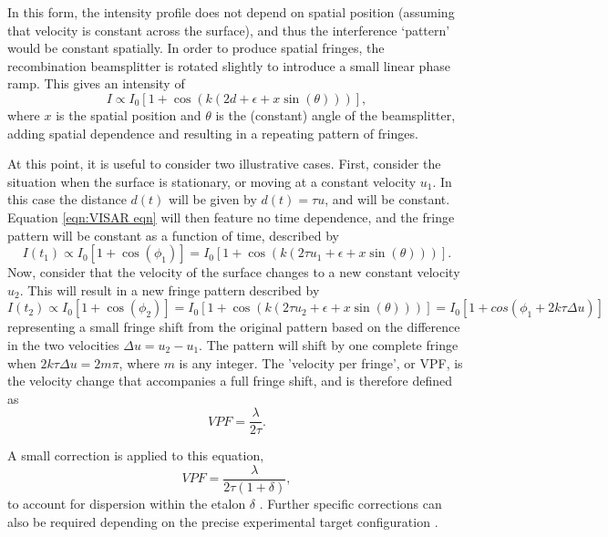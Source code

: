 In this form, the intensity profile does not depend on spatial position (assuming that velocity is constant across the surface), and thus the interference `pattern' would be constant spatially. In order to produce spatial fringes, the recombination beamsplitter is rotated slightly to introduce a small linear phase ramp. This gives an intensity of \begin{equation} \label{eqn:VISAR eqn}I \propto  I_0 [1 + \cos(k (2d + \epsilon + x\sin(\theta) ))],\end{equation} where $x$ is the spatial position and $\theta$ is the (constant) angle of the beamsplitter, adding spatial dependence and resulting in a repeating pattern of fringes.

At this point, it is useful to consider two illustrative cases. First, consider the situation when the surface is stationary, or moving at a constant velocity $u_1$. In this case the distance $d(t)$ will be given by $d(t) = \tau u$, and will be constant. Equation \ref{eqn:VISAR eqn} will then feature no time dependence, and the fringe pattern will be constant as a function of time, described by 
\begin{equation} I(t_1) \propto I_0 [1 + \cos(\phi_1)] =  I_0 [1 + \cos(k (2\tau u_1 + \epsilon + x\sin(\theta)))].\end{equation}
Now, consider that the velocity of the surface changes to a new constant velocity $u_2$. This will result in a new fringe pattern described by \begin{equation}I(t_2) \propto I_0 [1 + \cos(\phi_2)] =  I_0 [1 + \cos(k (2\tau u_2 + \epsilon + x\sin(\theta)))] = I_0 [1 + cos(\phi_1 + 2k\tau \Delta u)] \end{equation}
representing a small fringe shift from the original pattern based on the difference in the two velocities $\Delta u = u_2 - u_1$. The pattern will shift by one complete fringe when $2k\tau \Delta u = 2 m \pi$, where $m$ is any integer. The 'velocity per fringe', or VPF, is the velocity change that accompanies a full fringe shift, and is therefore defined as \begin{equation} VPF = \frac{\lambda}{2\tau}. \end{equation}

A small correction is applied to this equation, \begin{equation} VPF = \frac{\lambda}{2\tau (1 + \delta)}, \end{equation} to account for dispersion within the etalon $\delta$ \cite{Barker1974}. Further specific corrections can also be required depending on the precise experimental target configuration \cite{Barker1970, Celliers2004}.

